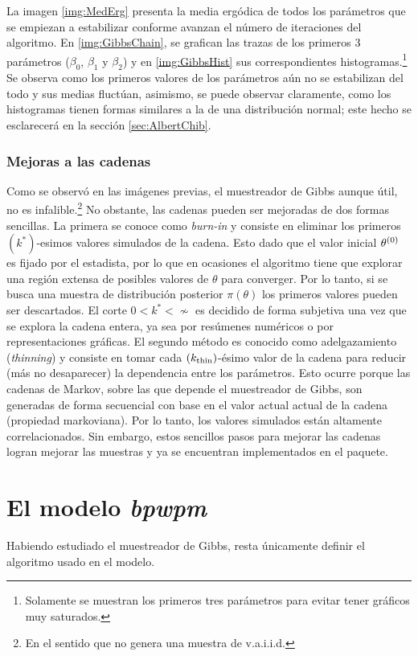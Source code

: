 \documentclass[../Main/Main.tex]{subfiles}
\begin{document}
La imagen \ref{img:MedErg} presenta la media ergódica de todos los parámetros que se empiezan a estabilizar conforme avanzan el número de iteraciones del algoritmo. En \ref{img:GibbsChain}, se grafican las trazas de los primeros 3 parámetros ($\beta_0$, $\beta_1$ y $\beta_2$) y en \ref{img:GibbsHist} sus correspondientes histogramas.\footnote{Solamente se muestran los primeros tres parámetros para evitar tener gráficos muy saturados.} Se observa como los primeros valores de los parámetros aún no se estabilizan del todo y sus medias fluctúan, asimismo, se puede observar claramente, como los histogramas tienen formas similares a la de una distribución normal; este hecho se esclarecerá en la sección \ref{sec:AlbertChib}. 

\subsubsection*{Mejoras a las cadenas}
Como se observó en las imágenes previas, el muestreador de Gibbs aunque útil, no es infalible.\footnote{En el sentido que no genera una muestra de v.a.i.i.d.} No obstante, las cadenas pueden ser mejoradas de dos formas sencillas. La primera se conoce como \textit{burn-in} y consiste en eliminar los primeros $(k^*)$-esimos valores simulados de la cadena. Esto dado que el valor inicial $\theta^{(0)}$ es fijado por el estadista, por lo que en ocasiones el algoritmo tiene que explorar una región extensa de posibles valores de $\theta$ para converger. Por lo tanto, si se busca una muestra de distribución posterior $\pi(\theta)$ los primeros valores pueden ser descartados. El corte $0<k^*<\nsim$ es decidido de forma subjetiva una vez que se explora la cadena entera, ya sea por resúmenes numéricos o por representaciones gráficas. El segundo método es conocido como adelgazamiento (\textit{thinning}) y consiste en tomar cada $(k_{\text{thin}})$-ésimo valor de la cadena para reducir (más no desaparecer) la dependencia entre los parámetros. Esto ocurre porque las cadenas de Markov, sobre las que depende el muestreador de Gibbs, son generadas de forma secuencial con base en el valor actual actual de la cadena (propiedad markoviana). Por lo tanto, los valores simulados están altamente correlacionados. Sin embargo, estos sencillos pasos para mejorar las cadenas logran mejorar las muestras y ya se encuentran implementados en el paquete.

\section{El modelo \textit{bpwpm}} 
Habiendo estudiado el muestreador de Gibbs, resta únicamente definir el algoritmo usado en el modelo.
\end{document}
